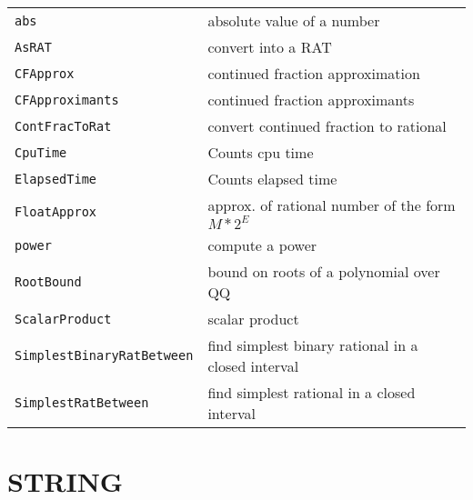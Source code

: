 \documentclass[a4paper]{mybook}
\begin{document}
\begin{center}
\begin{longtable}{ll}
   
{\verb~abs~} &
      absolute value of a number\\
   
{\verb~AsRAT~} &
      convert into a RAT\\
   
{\verb~CFApprox~} &
      continued fraction approximation\\
   
{\verb~CFApproximants~} &
      continued fraction approximants\\
   
{\verb~ContFracToRat~} &
      convert continued fraction to rational\\
   
{\verb~CpuTime~} &
      Counts cpu time\\
   
{\verb~ElapsedTime~} &
      Counts elapsed time\\
   
{\verb~FloatApprox~} &
      approx. of rational number of the form $M*2^E$\\
   
{\verb~power~} &
      compute a power\\
   
{\verb~RootBound~} &
      bound on roots of a polynomial over QQ\\
   
{\verb~ScalarProduct~} &
      scalar product\\
   
{\verb~SimplestBinaryRatBetween~} &
      find simplest binary rational in a closed interval\\
   
{\verb~SimplestRatBetween~} &
      find simplest rational in a closed interval\\
   
\end{longtable}
\end{center}

\noindent



\chapter{STRING}
\label{STRING}

      
\end{document}
